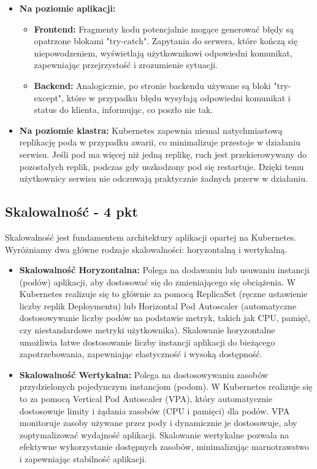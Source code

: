 \documentclass[12pt,a4paper]{article}
\begin{document}
\begin{itemize}
  \item \textbf{Na poziomie aplikacji:} 
  \begin{itemize}
    \item \textbf{Frontend:} Fragmenty kodu potencjalnie mogące generować błędy są opatrzone blokami "try-catch". Zapytania do serwera, które kończą się niepowodzeniem, wyświetlają użytkownikowi odpowiedni komunikat, zapewniając przejrzystość i zrozumienie sytuacji.
    \item \textbf{Backend:} Analogicznie, po stronie backendu używane są bloki "try-except", które w przypadku błędu wysyłają odpowiedni komunikat i status do klienta, informując, co poszło nie tak.
  \end{itemize}
  
  \item \textbf{Na poziomie klastra:} 
  Kubernetes zapewnia niemal natychmiastową replikację poda w przypadku awarii, co minimalizuje przestoje w działaniu serwisu. Jeśli pod ma więcej niż jedną replikę, ruch jest przekierowywany do pozostałych replik, podczas gdy uszkodzony pod się restartuje. Dzięki temu użytkownicy serwisu nie odczuwają praktycznie żadnych przerw w działaniu.
\end{itemize}


\subsection{Skalowalność - 4 pkt}
\label{sec:ExamplesSection}

Skalowalność jest fundamentem architektury aplikacji opartej na Kubernetes. Wyróżniamy dwa główne rodzaje skalowalności: horyzontalną i wertykalną.

\begin{itemize}
    \item \textbf{Skalowalność Horyzontalna:} Polega na dodawaniu lub usuwaniu instancji (podów) aplikacji, aby dostosować się do zmieniającego się obciążenia. W Kubernetes realizuje się to głównie za pomocą ReplicaSet (ręczne ustawienie liczby replik Deploymentu) lub Horizontal Pod Autoscaler (automatyczne dostosowywanie liczby podów na podstawie metryk, takich jak CPU, pamięć, czy niestandardowe metryki użytkownika). Skalowanie horyzontalne umożliwia łatwe dostosowanie liczby instancji aplikacji do bieżącego zapotrzebowania, zapewniając elastyczność i wysoką dostępność.
    
    \item \textbf{Skalowalność Wertykalna:} Polega na dostosowywaniu zasobów przydzielonych pojedynczym instancjom (podom). W Kubernetes realizuje się to za pomocą Vertical Pod Autoscaler (VPA), który automatycznie dostosowuje limity i żądania zasobów (CPU i pamięci) dla podów. VPA monitoruje zasoby używane przez pody i dynamicznie je dostosowuje, aby zoptymalizować wydajność aplikacji. Skalowanie wertykalne pozwala na efektywne wykorzystanie dostępnych zasobów, minimalizując marnotrawstwo i zapewniając stabilność aplikacji.
\end{itemize}
\end{document}
